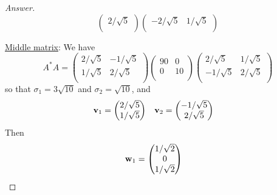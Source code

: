 \documentclass[../psets.tex]{subfiles}
\begin{document}
\begin{enumerate}[label={\textbf{3.\arabic*.}}]
\begin{proof}[Answer]
\begin{equation*}
\begin{pmatrix}
                2/\sqrt{5}\\
            \end{pmatrix}
            \begin{pmatrix}
                -2/\sqrt{5} & 1/\sqrt{5}\\
            \end{pmatrix}
        \end{equation*}\par
        \underline{Middle matrix}: We have
        \begin{equation*}
            A^*A =
            \begin{pmatrix}
                2/\sqrt{5} & -1/\sqrt{5}\\
                1/\sqrt{5} & 2/\sqrt{5}\\
            \end{pmatrix}
            \begin{pmatrix}
                90 & 0\\
                0 & 10\\
            \end{pmatrix}
            \begin{pmatrix}
                2/\sqrt{5} & 1/\sqrt{5}\\
                -1/\sqrt{5} & 2/\sqrt{5}\\
            \end{pmatrix}
        \end{equation*}
        so that $\sigma_1=3\sqrt{10}$ and $\sigma_2=\sqrt{10}$, and
        \begin{align*}
            \mathbf{v}_1 &=
            \begin{pmatrix}
                2/\sqrt{5}\\
                1/\sqrt{5}\\
            \end{pmatrix}&
            \mathbf{v}_2 &=
            \begin{pmatrix}
                -1/\sqrt{5}\\
                2/\sqrt{5}\\
            \end{pmatrix}
        \end{align*}
        Then
        \begin{align*}
            \mathbf{w}_1 &=
            \begin{pmatrix}
                1/\sqrt{2}\\
                0\\
                1/\sqrt{2}\\

\end{pmatrix}
\end{align*}
\end{proof}
\end{enumerate}
\end{document}
